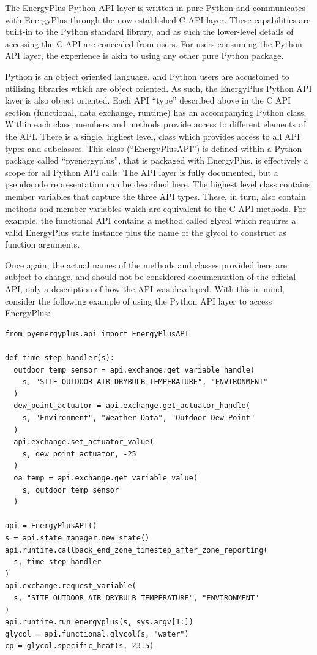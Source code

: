 \documentclass[5p, authoryear]{elsarticle}
\begin{document}
The EnergyPlus Python API layer is written in pure Python and communicates with EnergyPlus through the now established C API layer.  These capabilities are built-in to the Python standard library, and as such the lower-level details of accessing the C API are concealed from users.  For users consuming the Python API layer, the experience is akin to using any other pure Python package.

Python is an object oriented language, and Python users are accustomed to utilizing libraries which are object oriented.  As such, the EnergyPlus Python API layer is also object oriented.  Each API “type” described above in the C API section (functional, data exchange, runtime) has an accompanying Python class.  Within each class, members and methods provide access to different elements of the API.  There is a single, highest level, class which provides access to all API types and subclasses.  This class (“EnergyPlusAPI”) is defined within a Python package called “pyenergyplus”, that is packaged with EnergyPlus, is effectively a scope for all Python API calls.  The API layer is fully documented, but a pseudocode representation can be described here.  The highest level class contains member variables that capture the three API types.  These, in turn, also contain methods and member variables which are equivalent to the C API methods.  For example, the functional API contains a method called glycol which requires a valid EnergyPlus state instance plus the name of the glycol to construct as function arguments.

Once again, the actual names of the methods and classes provided here are subject to change, and should not be considered documentation of the official API, only a description of how the API was developed.  With this in mind, consider the following example of using the Python API layer to access EnergyPlus:

\lstset{language=python}
\begin{lstlisting}
from pyenergyplus.api import EnergyPlusAPI

def time_step_handler(s):
  outdoor_temp_sensor = api.exchange.get_variable_handle(
    s, "SITE OUTDOOR AIR DRYBULB TEMPERATURE", "ENVIRONMENT"
  )
  dew_point_actuator = api.exchange.get_actuator_handle(
    s, "Environment", "Weather Data", "Outdoor Dew Point"
  )
  api.exchange.set_actuator_value(
    s, dew_point_actuator, -25
  )
  oa_temp = api.exchange.get_variable_value(
    s, outdoor_temp_sensor
  )

api = EnergyPlusAPI()
s = api.state_manager.new_state()
api.runtime.callback_end_zone_timestep_after_zone_reporting(
  s, time_step_handler
)
api.exchange.request_variable(
  s, "SITE OUTDOOR AIR DRYBULB TEMPERATURE", "ENVIRONMENT"
)
api.runtime.run_energyplus(s, sys.argv[1:])
glycol = api.functional.glycol(s, "water")
cp = glycol.specific_heat(s, 23.5)
\end{lstlisting}
\end{document}
